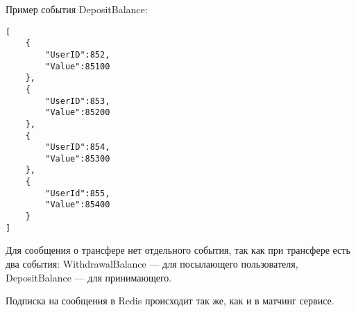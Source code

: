 Пример события DepositBalance:

\begin{lstlisting}
[
    {
        "UserID":852,
        "Value":85100
    },
    {
        "UserID":853,
        "Value":85200
    },
    {
        "UserID":854,
        "Value":85300
    },
    {
        "UserId":855,
        "Value":85400
    }
]
\end{lstlisting}

Для сообщения о трансфере нет отдельного события, так как при трансфере есть два события: WithdrawalBalance — для посылающего пользователя, DepositBalance — для принимающего.

Подписка на сообщения в Redis происходит так же, как и в матчинг сервисе.
